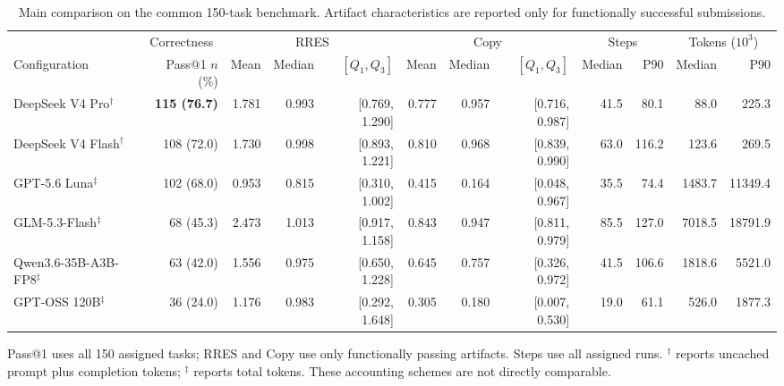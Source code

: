 \begin{table}[tbp]
  \caption{Main comparison on the common 150-task benchmark. Artifact
  characteristics are reported only for functionally successful submissions.}
  \label{tab:main}

  \centering
  \footnotesize
  \setlength{\tabcolsep}{2.2pt}
  \renewcommand{\arraystretch}{1.12}

  \begin{tabularx}{\linewidth}{@{}Xr rrr rrr rr rr@{}}
    \toprule

    &
    \multicolumn{1}{c}{Correctness} &
    \multicolumn{3}{c}{RRES} &
    \multicolumn{3}{c}{Copy} &
    \multicolumn{2}{c}{Steps} &
    \multicolumn{2}{c}{Tokens ($10^3$)} \\

    \cmidrule(lr){2-2}
    \cmidrule(lr){3-5}
    \cmidrule(lr){6-8}
    \cmidrule(lr){9-10}
    \cmidrule(lr){11-12}

    Configuration
      & \shortstack{Pass@1\\$n$ (\%)}
      & Mean
      & Median
      & $[Q_1,Q_3]$
      & Mean
      & Median
      & $[Q_1,Q_3]$
      & Median
      & P90
      & Median
      & P90 \\

    \midrule
    DeepSeek V4 Pro$^{\dagger}$ & \textbf{115 (76.7)} & 1.781 & 0.993 & [0.769, 1.290] & 0.777 & 0.957 & [0.716, 0.987] & 41.5 & 80.1 & 88.0 & 225.3 \\
    DeepSeek V4 Flash$^{\dagger}$ & 108 (72.0) & 1.730 & 0.998 & [0.893, 1.221] & 0.810 & 0.968 & [0.839, 0.990] & 63.0 & 116.2 & 123.6 & 269.5 \\
    GPT-5.6 Luna$^{\ddagger}$ & 102 (68.0) & 0.953 & 0.815 & [0.310, 1.002] & 0.415 & 0.164 & [0.048, 0.967] & 35.5 & 74.4 & 1483.7 & 11349.4 \\
    GLM-5.3-Flash$^{\ddagger}$ & 68 (45.3) & 2.473 & 1.013 & [0.917, 1.158] & 0.843 & 0.947 & [0.811, 0.979] & 85.5 & 127.0 & 7018.5 & 18791.9 \\
    Qwen3.6-35B-A3B-FP8$^{\ddagger}$ & 63 (42.0) & 1.556 & 0.975 & [0.650, 1.228] & 0.645 & 0.757 & [0.326, 0.972] & 41.5 & 106.6 & 1818.6 & 5521.0 \\
    GPT-OSS 120B$^{\ddagger}$ & 36 (24.0) & 1.176 & 0.983 & [0.292, 1.648] & 0.305 & 0.180 & [0.007, 0.530] & 19.0 & 61.1 & 526.0 & 1877.3 \\


    \bottomrule
  \end{tabularx}

  \par\smallskip
  \begin{minipage}{\linewidth}
    \footnotesize
    Pass@1 uses all 150 assigned tasks; RRES and Copy use only functionally
    passing artifacts. Steps use all assigned runs. $^{\dagger}$ reports
    uncached prompt plus completion tokens; $^{\ddagger}$ reports total
    tokens. These accounting schemes are not directly comparable.
  \end{minipage}

\end{table}
